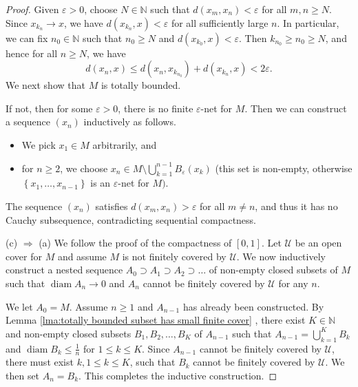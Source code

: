 \documentclass[a4paper,11pt]{article}
\begin{document}
\begin{proof}
Given $\varepsilon>0$, choose $N \in \mathbb{N}$ such that $d\left(x_{m}, x_{n}\right)<\varepsilon$ for all $m, n \geqslant N$. Since $x_{k_{n}} \rightarrow x$, we have $d\left(x_{k_{n}}, x\right)<\varepsilon$ for all sufficiently large $n$. In particular, we can fix $n_{0} \in \mathbb{N}$ such that $n_{0} \geqslant N$ and $d\left(x_{k_{0}}, x\right)<\varepsilon$. Then $k_{n_{0}} \geqslant n_{0} \geqslant N$, and hence for all $n \geqslant N$, we have
$$
d\left(x_{n}, x\right) \leqslant d\left(x_{n}, x_{k_{n_{0}}}\right)+d\left(x_{k_{n}}, x\right)<2 \varepsilon.
$$
We next show that $M$ is totally bounded. 

If not, then for some $\varepsilon>0$, there is no finite $\varepsilon$-net for $M$. Then we can construct a sequence $\left(x_{n}\right)$ inductively as follows. 
\begin{itemize}
    \item We pick $x_{1} \in M$ arbitrarily, and 
    \item for $n \geqslant 2$, we choose $x_{n} \in M \setminus \bigcup_{k=1}^{n-1} B_{\varepsilon}\left(x_{k}\right)$ (this set is non-empty, otherwise $\left\{x_{1}, \ldots, x_{n-1}\right\}$ is an $\varepsilon$-net for $M)$.
\end{itemize}
The sequence $\left(x_{n}\right)$ satisfies $d\left(x_{m}, x_{n}\right)>\varepsilon$ for all $m \neq n$, and thus it has no Cauchy subsequence, contradicting sequential compactness.

(c) $\Longrightarrow$ (a) We follow the proof of the compactness of $[0,1]$. 
Let $\mathcal{U}$ be an open cover for $M$ and assume $M$ is not finitely covered by $\mathcal{U}$. We now inductively construct a nested sequence $A_{0} \supset A_{1} \supset A_{2} \supset \ldots$ of non-empty closed subsets of $M$ such that $\operatorname{diam} A_{n} \rightarrow 0$ and $A_{n}$ cannot be finitely covered by $\mathcal{U}$ for any $n$. 

We let $A_{0}=M$. Assume $n \geqslant 1$ and $A_{n-1}$ has already been constructed. By Lemma \ref{lma:totally bounded subset has small finite cover} , there exist $K \in \mathbb{N}$ and non-empty closed subsets $B_{1}, B_{2}, \ldots, B_{K}$ of $A_{n-1}$ such that $A_{n-1}=\bigcup_{k=1}^{K} B_{k}$ and $\operatorname{diam} B_{k} \leqslant \frac{1}{n}$ for $1 \leqslant k \leqslant K$. Since $A_{n-1}$ cannot be finitely covered by $\mathcal{U}$, there must exist $k, 1 \leqslant k \leqslant K$, such that $B_{k}$ cannot be finitely covered by $\mathcal{U}$. We then set $A_{n}=B_{k}$. This completes the inductive construction.


\end{proof}
\end{document}
